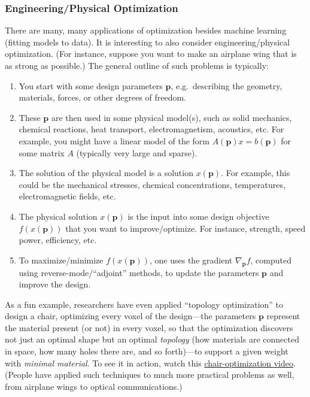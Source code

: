 \subsubsection{Engineering/Physical Optimization}

There are many, many applications of optimization besides machine learning (fitting models to data).  It is interesting to also consider engineering/physical optimization. (For instance, suppose you want to make an airplane wing that is as strong as possible.) The general outline of such problems is typically:
\begin{enumerate}
    \item You start with some design parameters $\mathbf{p}$, e.g.~describing the geometry, materials, forces, or other degrees of freedom. 
    \item These $\mathbf{p}$ are then used in some  physical model(s), such as solid mechanics, chemical reactions, heat transport, electromagnetism, acoustics, etc.  For example, you might have a linear model of the form $A(\mathbf{p}) x = b(\mathbf{p})$ for some matrix $A$ (typically very large and sparse).
    \item The solution of the physical model is a solution $x(\mathbf{p})$.  For example, this could be the mechanical stresses, chemical concentrations, temperatures, electromagnetic fields, etc.
    \item The physical solution $x(\mathbf{p})$ is the input into some design objective $f(x(\mathbf{p}))$ that you want to improve/optimize.  For instance, strength, speed power, efficiency, etc. 
    \item To maximize/minimize $f(x(\mathbf{p}))$, one uses the gradient $\nabla_{\mathbf{p}}f$, computed using reverse-mode/``adjoint'' methods, to update the parameters $\mathbf{p}$ and improve the design.
\end{enumerate}
\noindent As a fun example, researchers have even applied ``topology optimization'' to design a chair, optimizing every voxel of the design---the parameters $\mathbf{p}$ represent the material present (or not) in every voxel, so that the optimization discovers not just an optimal shape but an optimal \emph{topology} (how materials are connected in space, how many holes there are, and so forth)---to support a given weight with \textit{minimal material}. To see it in action, watch this \href{https://www.youtube.com/watch?v=bJ_nSSBl040&embeds_referring_euri=https%3A%2F%2Fdocs.google.com%2F&embeds_referring_origin=https%3A%2F%2Fdocs.google.com&source_ve_path=Mjg2NjY&feature=emb_logo}{chair-optimization video}.   (People have applied such techniques to much more practical problems as well, from airplane wings to optical communications.)


